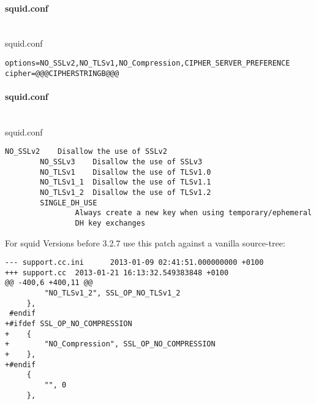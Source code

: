 \paragraph*{squid.conf}\mbox{}\\
squid.conf

\begin{lstlisting}[breaklines]
options=NO_SSLv2,NO_TLSv1,NO_Compression,CIPHER_SERVER_PREFERENCE 
cipher=@@@CIPHERSTRINGB@@@
\end{lstlisting}



\paragraph*{squid.conf}\mbox{}\\
squid.conf


\begin{lstlisting}[breaklines]
		NO_SSLv2    Disallow the use of SSLv2
		NO_SSLv3    Disallow the use of SSLv3
		NO_TLSv1    Disallow the use of TLSv1.0
		NO_TLSv1_1  Disallow the use of TLSv1.1
		NO_TLSv1_2  Disallow the use of TLSv1.2
		SINGLE_DH_USE
				Always create a new key when using temporary/ephemeral
				DH key exchanges
\end{lstlisting}

For squid Versions before 3.2.7 use this patch against a vanilla source-tree:

\begin{lstlisting}[breaklines]
--- support.cc.ini      2013-01-09 02:41:51.000000000 +0100
+++ support.cc  2013-01-21 16:13:32.549383848 +0100
@@ -400,6 +400,11 @@
         "NO_TLSv1_2", SSL_OP_NO_TLSv1_2
     },
 #endif
+#ifdef SSL_OP_NO_COMPRESSION
+    {
+        "NO_Compression", SSL_OP_NO_COMPRESSION
+    },
+#endif
     {
         "", 0
     },
\end{lstlisting}



